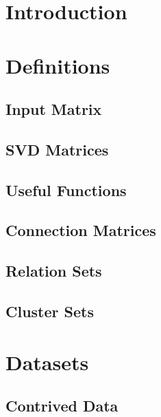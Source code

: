 \documentclass[ClusteringConnectionsMAIN.tex]{subfiles}
\begin{document}
%
%
\chapter{Introduction}



%
%
\chapter{Definitions}

\section{Input Matrix}


\section{SVD Matrices}


\section{Useful Functions}


\section{Connection Matrices}


\section{Relation Sets}


\section{Cluster Sets}



%
%
\chapter{Datasets}


\section{Contrived Data}

\end{document}
